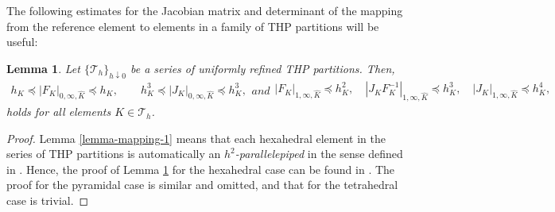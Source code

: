 \documentclass[twoside,reqno,final]{amsart}
\newtheorem{lemma}{Lemma}
\begin{document}
The following estimates for the Jacobian matrix and determinant of the mapping from the reference element to elements
in a family of {\sf THP} partitions will be useful:
\begin{lemma}
 \label{lemma-mapping-2}
 Let $\{\mathcal{T}_h\}_{h\downarrow 0}$ be a series of uniformly refined {\sf THP} partitions.
 Then, 
 \begin{subequations}
 \label{eq}
 \begin{align}
 \label{eq-1}
h_K\preceq|F_K|_{0,\infty, \widehat K} \preceq h_K,\quad \quad
h_K^3 \preceq|J_K|_{0,\infty, \widehat K} \preceq h_K^3,
 \end{align}
and 
\begin{align}
 \label{eq-2}
|F_K|_{1,\infty, \widehat K} \preceq h_K^2,\quad
|J_KF_K^{-1}|_{1,\infty, \widehat K} \preceq h_K^{3},
\quad
|J_K|_{1,\infty, \widehat K} \preceq h_K^{4},
\end{align}
 \end{subequations}
holds for all elements $K\in \mathcal{T}_h$.
\end{lemma}
\begin{proof}
Lemma \ref{lemma-mapping-1} means
that each hexahedral element in the series of {\sf THP} partitions is automatically
an {\it $h^2$-parallelepiped} in the sense defined in 
\cite[Chapter 3]{IngramWheelerYotov10}. 
Hence, the proof of Lemma \ref{lemma-mapping-2} 
for the hexahedral case can be found in \cite[Lemma 3.1]{IngramWheelerYotov10}. 
The proof for the pyramidal case is similar and omitted, and that for the tetrahedral case is trivial.
\end{proof}
\end{document}
